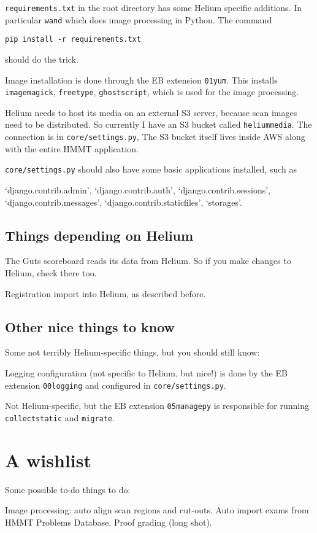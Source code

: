 \begin{itemize}
	\ii \texttt{requirements.txt} in the root directory
	has some Helium specific additions.
	In particular \texttt{wand} which does image processing in Python.
	The command
	\begin{center}
		\texttt{pip install -r requirements.txt}
	\end{center}
	should do the trick.

	\ii Image installation is done through the EB extension \texttt{01yum}.
	This installs \texttt{imagemagick}, \texttt{freetype}, \texttt{ghostscript},
	which is used for the image processing.

	\ii Helium needs to host its media on an external S3 server,
	because scan images need to be distributed.
	So currently I have an S3 bucket called \texttt{heliummedia}.
	The connection is in \texttt{core/settings.py},
	The S3 bucket itself lives inside AWS along with the entire HMMT application.
	
	\ii \texttt{core/settings.py} should also have some basic applications
	installed, such as
	\begin{itemize}
		\ii `django.contrib.admin',
		\ii `django.contrib.auth',
		\ii `django.contrib.sessions',
		\ii `django.contrib.messages',
		\ii `django.contrib.staticfiles',
		\ii `storages'.
	\end{itemize}
\end{itemize}

\subsection{Things depending on Helium}
\begin{itemize}
	\ii The Guts scoreboard reads its data from Helium.
	So if you make changes to Helium, check there too.
	
	\ii Registration import into Helium, as described before.
\end{itemize}

\subsection{Other nice things to know}
Some not terribly Helium-specific things, but you should still know:
\begin{itemize}
	\ii Logging configuration (not specific to Helium, but nice!)
	is done by the EB extension \texttt{00logging}
	and configured in \texttt{core/settings.py}.
	
	\ii Not Helium-specific, but the EB extension \texttt{05managepy}
	is responsible for running \texttt{collectstatic} and \texttt{migrate}.
\end{itemize}

\section{A wishlist}
Some possible to-do things to do:
\begin{itemize}
	\ii Image processing: auto align scan regions and cut-outs.
	\ii Auto import exams from HMMT Problems Database.
	\ii Proof grading (long shot).
\end{itemize}
